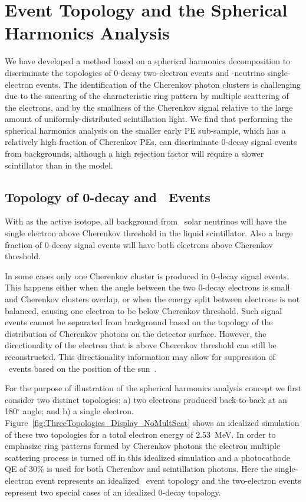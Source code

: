 \section{Event Topology and the Spherical Harmonics Analysis}
\label{sec:topology_and_harmonics}

We have developed a method based on a spherical harmonics
decomposition to discriminate the topologies of 0\nbb-decay
two-electron events and \B-neutrino single-electron events. The
identification of the Cherenkov photon clusters is challenging due to
the smearing of the characteristic ring pattern by multiple scattering
of the electrons, and by the smallness of the Cherenkov signal
relative to the large amount of uniformly-distributed scintillation
light.  We find that performing the spherical harmonics analysis on
the smaller early PE sub-sample, which has a relatively high fraction
of Cherenkov PEs, can discriminate 0\nbb-decay signal events from
backgrounds, although a high rejection factor will require a slower
scintillator than in the model.

\subsection{Topology of 0\nbb-decay and \B~Events}
\label{subsec:topology}

With \Te as the active isotope, all background from \B~solar neutrinos
will have the single electron above Cherenkov threshold in the liquid
scintillator. Also a large fraction of 0\nbb-decay signal events will
have both electrons above Cherenkov threshold.

In some cases only one Cherenkov cluster is produced in 0\nbb-decay
signal events. This happens either when the angle between the two
0\nbb-decay electrons is small and Cherenkov clusters overlap, or when
the energy split between electrons is not balanced, causing one
electron to be below Cherenkov threshold.  Such signal events cannot
be separated from background based on the topology of the distribution
of Cherenkov photons on the detector surface.  However, the
directionality of the electron that is above Cherenkov threshold can
still be reconstructed. This directionality information may allow for
suppression of \B~events based on the position of the
sun~\cite{sun_direction_cut}.

For the purpose of illustration of the spherical harmonics analysis
concept we first consider two distinct topologies: a) two electrons
produced back-to-back at an 180$^{\circ}$ angle;  and b) a single electron.
Figure~\ref{fig:ThreeTopologies_Display_NoMultScat} shows an idealized
simulation of these two topologies for a total electron energy of
2.53~MeV. In order to emphasize ring patterns formed by Cherenkov
photons the electron multiple scattering process is turned off in this
idealized simulation and a photocathode QE of 30\% is used for both
Cherenkov and scintillation photons. Here the single-electron event
represents an idealized \B~event topology and the two-electron events
represent two special cases of an idealized 0\nbb-decay topology.



